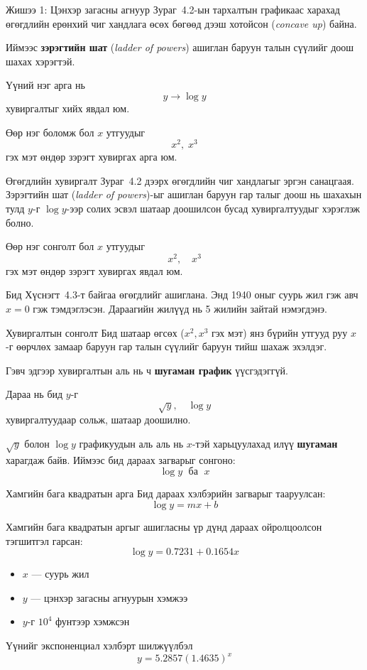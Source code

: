 \documentclass[dvipsnames]{beamer}
\begin{document}
\begin{frame}{Жишээ 1: Цэнхэр загасны агнуур}
\small
Зураг~4.2-ын тархалтын графикаас харахад өгөгдлийн ерөнхий чиг
хандлага өсөх бөгөөд дээш хотойсон (\emph{concave up}) байна.

\medskip
Иймээс \textbf{зэрэгтийн шат} (\emph{ladder of powers}) ашиглан баруун
талын сүүлийг доош шахах хэрэгтэй.

\medskip
Үүний нэг арга нь
\[
y \rightarrow \log y
\]
хувиргалтыг хийх явдал юм.

\medskip
Өөр нэг боломж бол $x$ утгуудыг
\[
x^2, \; x^3
\]
гэх мэт өндөр зэрэгт хувиргах арга юм.
\end{frame}

\begin{frame}{Өгөгдлийн хувиргалт}
\small
Зураг~4.2 дээрх өгөгдлийн чиг хандлагыг эргэн санацгаая. Зэрэгтийн шат
(\emph{ladder of powers})-ыг ашиглан баруун гар талыг доош нь шахахын
тулд $y$-г $\log y$-ээр солих эсвэл шатаар доошилсон бусад
хувиргалтуудыг хэрэглэж болно.

\medskip
Өөр нэг сонголт бол $x$ утгуудыг
\[
x^2, \quad x^3
\]
гэх мэт өндөр зэрэгт хувиргах явдал юм.

\medskip
Бид Хүснэгт~4.3-т байгаа өгөгдлийг ашиглана. Энд 1940 оныг суурь жил
гэж авч $x=0$ гэж тэмдэглэсэн. Дараагийн жилүүд нь 5 жилийн зайтай
нэмэгдэнэ.
\end{frame}

\begin{frame}{Хувиргалтын сонголт}
\small
Бид шатаар өгсөх ($x^2, x^3$ гэх мэт) янз бүрийн утгууд руу $x$-г
өөрчлөх замаар баруун гар талын сүүлийг баруун тийш шахаж эхэлдэг.

\medskip
Гэвч эдгээр хувиргалтын аль нь ч \textbf{шугаман график}
үүсгэдэггүй.

\medskip
Дараа нь бид $y$-г
\[
\sqrt{y}, \quad \log y
\]
хувиргалтуудаар сольж, шатаар доошилно.

\medskip
$\sqrt{y}$ болон $\log y$ графикуудын аль аль нь $x$-тэй
харьцуулахад илүү \textbf{шугаман} харагдаж байв. Иймээс бид дараах
загварыг сонгоно:
\[
\log y \;\text{ ба }\; x
\]
\end{frame}

\begin{frame}{Хамгийн бага квадратын арга}
\small
Бид дараах хэлбэрийн загварыг тааруулсан:
\[
\log y = mx + b
\]

Хамгийн бага квадратын аргыг ашигласны үр дүнд дараах ойролцоолсон
тэгшитгэл гарсан:
\[
\log y = 0.7231 + 0.1654x
\]

\begin{itemize}
\item $x$ --- суурь жил
\item $y$ --- цэнхэр загасны агнуурын хэмжээ
\item $y$-г $10^{4}$ фунтээр хэмжсэн
\end{itemize}

Үүнийг экспоненциал хэлбэрт шилжүүлбэл
\[
y = 5.2857(1.4635)^x
\]
\end{frame}
\end{document}
